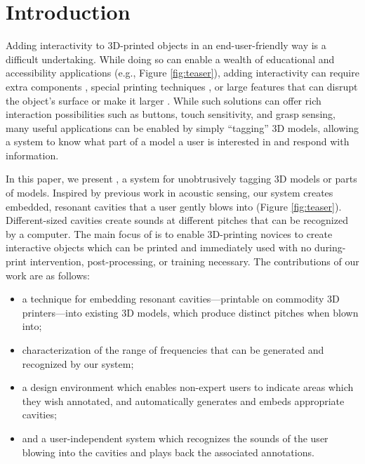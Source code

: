   \section{Introduction}
    Adding interactivity to 3D-printed objects in an end-user-friendly way is a
    difficult undertaking. While doing so can enable a wealth of educational and
    accessibility applications (e.g., Figure \ref{fig:teaser}), adding
    interactivity can require extra components \cite{Savage:2013, Nappey:2014},
    special printing techniques \cite{Schmitz:2015, Bacher:2016, Peng:2015}, or
    large features that can disrupt the object's surface \cite{Harrison:2012kw,
    Ou:2016a, Savage:2015, Shi:2016} or make it larger \cite{Li:2016}. While
    such solutions can offer rich interaction possibilities such as buttons,
    touch sensitivity, and grasp sensing, many useful applications can be
    enabled by simply ``tagging'' 3D models, allowing a system to know what part
    of a model a user is interested in and respond with information.
    
    In this paper, we present \textit{\bh}, a system for unobtrusively tagging
    3D models or parts of models. Inspired by previous work in acoustic sensing,
    our system creates embedded, resonant cavities that a user gently blows into
    (Figure \ref{fig:teaser}). Different-sized cavities create sounds at
    different pitches that can be recognized by a computer. The main focus of
    \bh is to enable 3D-printing novices to create interactive objects which can
    be printed and immediately used with no during-print intervention,
    post-processing, or training necessary. The contributions of our work are as
    follows:

    \begin{itemize}
        \item a technique for embedding resonant cavities---printable on
          commodity 3D printers---into existing 3D models, which produce distinct
          pitches when blown into;
        \item characterization of the range of frequencies that can be generated
          and recognized by our system;
        \item a design environment which enables non-expert users to indicate
          areas which they wish annotated, and automatically generates and embeds
          appropriate cavities;
        \item and a user-independent system which recognizes the sounds of the
          user blowing into the cavities and plays back the associated
          annotations.
    \end{itemize}

